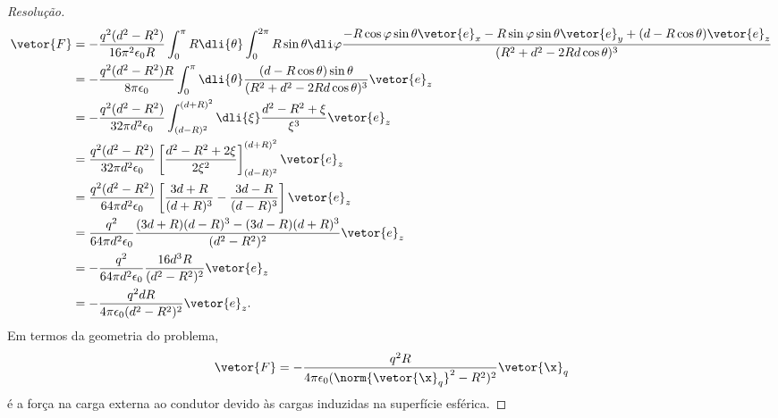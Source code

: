 \begin{proof}[Resolução]
\begin{align*}
        \vetor{F} &= -\frac{q^2(d^2 - R^2)}{16\pi^2\epsilon_0 R}\int_0^\pi R\dli{\theta}\int_0^{2\pi}R\sin\theta \dli\varphi \frac{-R\cos\varphi\sin\theta \vetor{e}_x - R \sin\varphi\sin\theta \vetor{e}_y + (d - R\cos\theta)\vetor{e}_z}{(R^2 + d^2 - 2Rd \cos \theta)^3}\\
                  &= - \frac{q^2(d^2 - R^2)R}{8\pi \epsilon_0} \int_0^\pi \dli{\theta} \frac{(d - R\cos\theta)\sin\theta}{(R^2 + d^2 - 2Rd \cos\theta)^3}\vetor{e}_z\\
                  &= - \frac{q^2(d^2 - R^2)}{32\pi d^2 \epsilon_0} \int_{(d - R)^2}^{(d + R)^2}\dli{\xi} \frac{d^2 - R^2 + \xi}{\xi^3}\vetor{e}_z\\
                  &= \frac{q^2(d^2 - R^2)}{32\pi d^2 \epsilon_0} \left[\frac{d^2 - R^2+2\xi}{2\xi^2}\right]_{(d - R)^2}^{(d + R)^2}\vetor{e}_z\\
                  &= \frac{q^2(d^2 - R^2)}{64\pi d^2 \epsilon_0} \left[\frac{3d + R}{(d + R)^3} - \frac{3d - R}{(d - R)^3}\right]\vetor{e}_z\\
                  &= \frac{q^2}{64\pi d^2 \epsilon_0} \frac{(3d + R)(d - R)^3 - (3d - R)(d + R)^3}{(d^2 - R^2)^2}\vetor{e}_z\\
                  &= -\frac{q^2}{64\pi d^2 \epsilon_0} \frac{16d^3 R}{(d^2 - R^2)^2}\vetor{e}_z\\
                  &= - \frac{q^2 dR}{4\pi \epsilon_0 (d^2 - R^2)^2 }\vetor{e}_z.
    \end{align*}
    Em termos da geometria do problema,
    \begin{equation*}
        \vetor{F} = -\frac{q^2 R}{4\pi \epsilon_0 (\norm{\vetor{\x}_q}^2 - R^2)^2}\vetor{\x}_q
    \end{equation*}
    é a força na carga externa ao condutor devido às cargas induzidas na superfície esférica.
\end{proof}
